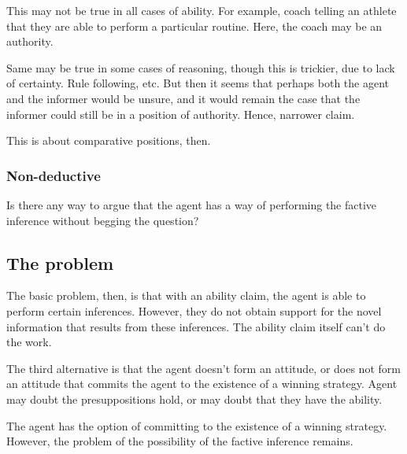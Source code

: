 \documentclass[10pt]{article}
\begin{document}
\begin{note}
  This may not be true in all cases of ability.
  For example, coach telling an athlete that they are able to perform a particular routine.
  Here, the coach may be an authority.

  Same may be true in some cases of reasoning, though this is trickier, due to lack of certainty.
  Rule following, etc.
  But then it seems that perhaps both the agent and the informer would be unsure, and it would remain the case that the informer could still be in a position of authority.
  Hence, narrower claim.

  This is about comparative positions, then.
\end{note}

\subsubsection{Non-deductive}
\label{sec:non-deductive}

\begin{note}[Idea?]
  Is there any way to argue that the agent has a way of performing the factive inference without begging the question?
\end{note}

\subsection{The problem}
\label{sec:problem}

The basic problem, then, is that with an ability claim, the agent is able to perform certain inferences.
However, they do not obtain support for the novel information that results from these inferences.
The ability claim itself can't do the work.

\begin{note}
  The third alternative is that the agent doesn't form an attitude, or does not form an attitude that commits the agent to the existence of a winning strategy.
  Agent may doubt the presuppositions hold, or may doubt that they have the ability.

  The agent has the option of committing to the existence of a winning strategy.
  However, the problem of the possibility of the factive inference remains.
\end{note}
\end{document}
